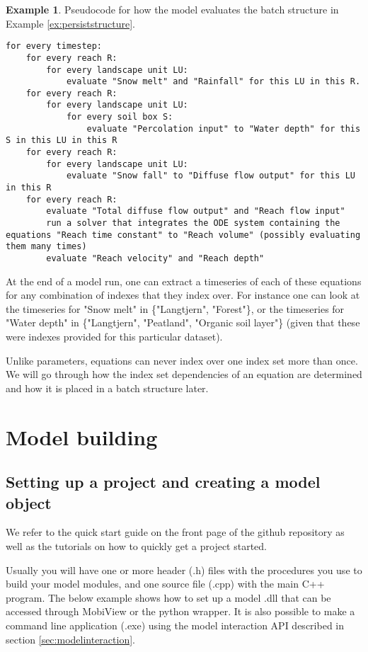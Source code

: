 \documentclass[11pt]{article}
\theoremstyle{definition}
\newtheorem{myexample}{Example}
\newenvironment{example}%
  {\begin{lrbox}{\examplebox}%
   \begin{minipage}{\dimexpr\linewidth-2\fboxsep}
   \begin{myexample}}%
  {\end{myexample}%
   \end{minipage}%
   \end{lrbox}%
   \begin{trivlist}
     \item[]\colorbox{silver}{\usebox\examplebox}
   \end{trivlist}}
\begin{document}
\begin{example}\label{ex:pseucocode}
Pseudocode for how the model evaluates the batch structure in Example \ref{ex:persiststructure}.
\begin{lstlisting}[style=textstyle]
for every timestep:
	for every reach R:
		for every landscape unit LU:
			evaluate "Snow melt" and "Rainfall" for this LU in this R.
	for every reach R:
		for every landscape unit LU:
			for every soil box S:
				evaluate "Percolation input" to "Water depth" for this S in this LU in this R
	for every reach R:
		for every landscape unit LU:
			evaluate "Snow fall" to "Diffuse flow output" for this LU in this R
	for every reach R:
		evaluate "Total diffuse flow output" and "Reach flow input"
		run a solver that integrates the ODE system containing the equations "Reach time constant" to "Reach volume" (possibly evaluating them many times)
		evaluate "Reach velocity" and "Reach depth"
\end{lstlisting}	
\end{example}

At the end of a model run, one can extract a timeseries of each of these equations for any combination of indexes that they index over. For instance one can look at the timeseries for "Snow melt" in \{"Langtjern", "Forest"\}, or the timeseries for "Water depth" in \{"Langtjern", "Peatland", "Organic soil layer"\} (given that these were indexes provided for this particular dataset).

Unlike parameters, equations can never index over one index set more than once. We will go through how the index set dependencies of an equation are determined and how it is placed in a batch structure later.

\section{Model building}\label{sec:modelbuilding}

\subsection{Setting up a project and creating a model object}

We refer to the quick start guide on the front page of the github repository as well as the tutorials on how to quickly get a project started.

Usually you will have one or more header (.h) files with the procedures you use to build your model modules, and one source file (.cpp) with the main C++ program. The below example shows how to set up a model .dll that can be accessed through MobiView or the python wrapper. It is also possible to make a command line application (.exe) using the model interaction API described in section \ref{sec:modelinteraction}.
\end{document}
